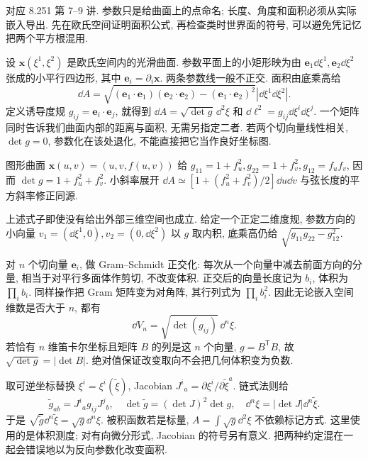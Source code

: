 \label{ch:basic-area}
对应 8.251 第 7--9 讲. 参数只是给曲面上的点命名; 长度、角度和面积必须从实际嵌入导出. 先在欧氏空间证明面积公式, 再检查类时世界面的符号, 可以避免凭记忆把两个平方根混用.

设 $\boldsymbol x(\xi^1,\xi^2)$ 是欧氏空间内的光滑曲面. 参数平面上的小矩形映为由
$\boldsymbol e_1\dd\xi^1,\boldsymbol e_2\dd\xi^2$ 张成的小平行四边形, 其中 $\boldsymbol e_i=\partial_i\boldsymbol x$. 两条参数线一般不正交. 面积由底乘高给
\[
 \dd A=\sqrt{(\boldsymbol e_1\cdot\boldsymbol e_1)
 (\boldsymbol e_2\cdot\boldsymbol e_2)
 -(\boldsymbol e_1\cdot\boldsymbol e_2)^2}
 |\dd\xi^1\dd\xi^2|.
\]
定义诱导度规 $g_{ij}=\boldsymbol e_i\cdot\boldsymbol e_j$, 就得到 $\dd A=\sqrt{\det g}\,\dd^2\xi$ 和 $\dd\ell^2=g_{ij}\dd\xi^i\dd\xi^j$. 一个矩阵同时告诉我们曲面内部的距离与面积, 无需另指定二者. 若两个切向量线性相关, $\det g=0$, 参数化在该处退化, 不能直接把它当作良好坐标图.

\begin{example}
图形曲面 $\boldsymbol x(u,v)=(u,v,f(u,v))$ 给
$g_{11}=1+f_u^2,g_{22}=1+f_v^2,g_{12}=f_uf_v$, 因而 $\det g=1+f_u^2+f_v^2$. 小斜率展开 $\dd A\simeq[1+(f_u^2+f_v^2)/2]\dd u\dd v$ 与弦长度的平方斜率修正同源.
\end{example}

上述式子即使没有给出外部三维空间也成立. 给定一个正定二维度规, 参数方向的小向量 $v_1=(\dd\xi^1,0),v_2=(0,\dd\xi^2)$ 以 $g$ 取内积, 底乘高仍给 $\sqrt{g_{11}g_{22}-g_{12}^2}$.

对 $n$ 个切向量 $\boldsymbol e_i$, 做 Gram--Schmidt 正交化: 每次从一个向量中减去前面方向的分量, 相当于对平行多面体作剪切, 不改变体积. 正交后的向量长度记为 $b_i$, 体积为 $\prod_i b_i$. 同样操作把 Gram 矩阵变为对角阵, 其行列式为 $\prod_i b_i^2$. 因此无论嵌入空间维数是否大于 $n$, 都有
\[
 \dd V_n=\sqrt{\det(g_{ij})}\,\dd^n\xi.
\]
若恰有 $n$ 维笛卡尔坐标且矩阵 $B$ 的列是这 $n$ 个向量, $g=B^{\mathsf T}B$, 故 $\sqrt{\det g}=|\det B|$. 绝对值保证改变取向不会把几何体积变为负数.

取可逆坐标替换 $\xi^i=\xi^i(\widetilde\xi)$, Jacobian $J^i{}_a=\partial\xi^i/\partial\widetilde\xi^a$. 链式法则给
\[
 \widetilde g_{ab}=J^i{}_a g_{ij}J^j{}_b,
 \quad\det\widetilde g=(\det J)^2\det g,
 \quad\dd^n\xi=|\det J|\dd^n\widetilde\xi.
\]
于是 $\sqrt{\widetilde g}\dd^n\widetilde\xi=\sqrt g\dd^n\xi$. 被积函数若是标量, $A=\int\sqrt g\dd^2\xi$ 不依赖标记方式. 这里使用的是体积测度; 对有向微分形式, Jacobian 的符号另有意义. 把两种约定混在一起会错误地以为反向参数化改变面积.


